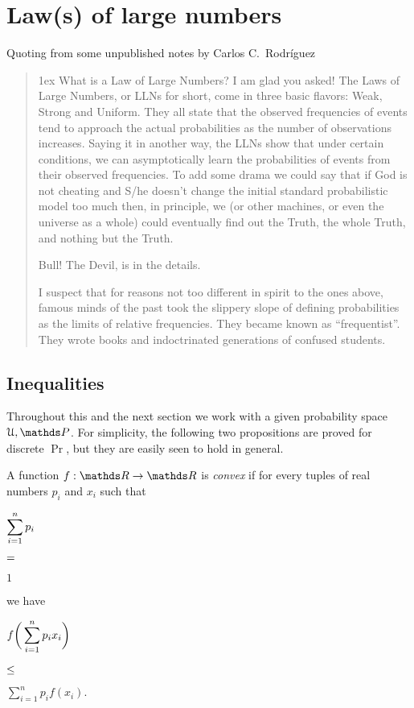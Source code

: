 \documentclass[scombinatorics.tex]{subfiles}
\begin{document}
\chapter{Law(s) of large numbers}
\label{ulln}



\def\medrel#1{\parbox[t]{5ex}{$\displaystyle\hfil #1$}}
\def\ceq#1#2#3{\parbox[t]{20ex}{$\displaystyle #1$}\medrel{#2}{$\displaystyle #3$}}

Quoting from some unpublished notes by Carlos C.~Rodr\'iguez

\begin{quotation}\parindent0mm\parskip1ex\noindent
What is a Law of Large Numbers?
I am glad you asked! The Laws of Large Numbers, or LLNs for short, come in
three basic flavors: Weak, Strong and Uniform. They all state that the observed
frequencies of events tend to approach the actual probabilities as the number
of observations increases. Saying it in another way, the LLNs show that under
certain conditions, we can asymptotically learn the probabilities of events from
their observed frequencies. To add some drama we could say that if God is
not cheating and S/he doesn’t change the initial standard probabilistic model
too much then, in principle, we (or other machines, or even the universe as a
whole) could eventually find out the Truth, the whole Truth, and nothing but
the Truth.

Bull! The Devil, is in the details.

I suspect that for reasons not too different in spirit to the ones above, famous
minds of the past took the slippery slope of defining probabilities as the limits
of relative frequencies. They became known as ``frequentist''. They wrote
books and indoctrinated generations of confused students.
\end{quotation}
\section{Inequalities}

Throughout this and the next section we work with a given probability space $\U,\Pr$.
For simplicity, the following two propositions are proved for discrete $\Pr$, but they are easily seen to hold in  general.

\begin{definition}\label{def_convex}
  A function $f:\RR\to\RR$ is \emph{convex\/} if for every tuples of real numbers $p_i$ and $x_i$ such that

  \ceq{\hfill\sum^n_{i=1}p_i}
  {=}
  {1}

  we have

  \ceq{\hfill f\bigg(\sum^n_{i=1}p_ix_i\bigg)}
  {\le}
  {\sum^n_{i=1}p_if(x_i).}\QED
\end{definition}
\end{document}
